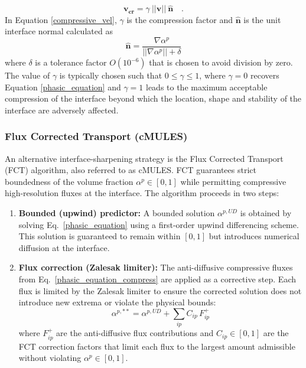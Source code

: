 \documentclass[12pt]{extarticle}
\newcommand{\<}{\langle}
\renewcommand{\>}{\rangle}
\theoremstyle{definition}
\begin{document}
\begin{equation}\label{compressive_vel}
    \mathbf{v_{cr}} = \gamma \ ||\mathbf{v}|| \ \mathbf{\hat{n}} \quad .
\end{equation}
In Equation \ref{compressive_vel}, $\gamma$ is the compression factor and $\mathbf{\hat{n}}$ is the unit interface normal calculated as
\begin{equation*}
    \mathbf{\hat{n}} = \frac{\nabla \alpha^p}{||\nabla \alpha^p||+\delta}
\end{equation*}
where $\delta$ is a tolerance factor $O(10^{-6})$ that is chosen to avoid division by zero. The value of $\gamma$ is typically chosen such that $0\le\gamma\le1$, where $\gamma=0$ recovers Equation \ref{phasic_equation} and $\gamma=1$ leads to the maximum acceptable compression of the interface beyond which the location, shape and stability of the interface are adversely affected.

\subsubsection{Flux Corrected Transport (cMULES)}

An alternative interface-sharpening strategy is the Flux Corrected Transport (FCT) algorithm, also referred to as cMULES. FCT guarantees strict boundedness of the volume fraction $\alpha^p \in [0,1]$ while permitting compressive high-resolution fluxes at the interface. The algorithm proceeds in two steps:

\begin{enumerate}
    \item \textbf{Bounded (upwind) predictor:} A bounded solution $\alpha^{p,UD}$ is obtained by solving Eq.~\ref{phasic_equation} using a first-order upwind differencing scheme. This solution is guaranteed to remain within $[0,1]$ but introduces numerical diffusion at the interface.

    \item \textbf{Flux correction (Zalesak limiter):} The anti-diffusive compressive fluxes from Eq.~\ref{phasic_equation_compress} are applied as a corrective step. Each flux is limited by the Zalesak limiter \cite{zalesak1979fully} to ensure the corrected solution does not introduce new extrema or violate the physical bounds:
    \begin{equation}
        \alpha^{p,**} = \alpha^{p,UD} + \sum_{ip} C_{ip}\,F^+_{ip}
    \end{equation}
    where $F^+_{ip}$ are the anti-diffusive flux contributions and $C_{ip} \in [0,1]$ are the FCT correction factors that limit each flux to the largest amount admissible without violating $\alpha^p \in [0,1]$.
\end{enumerate}
\end{document}

